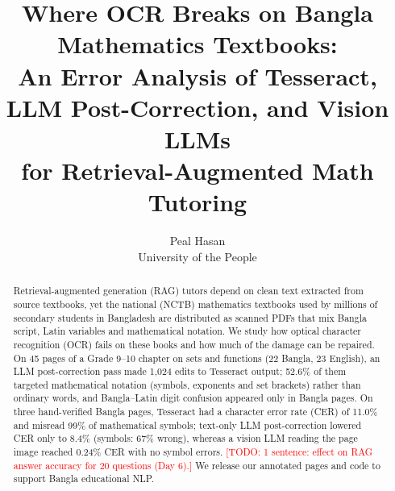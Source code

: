 \documentclass[11pt]{article}
\title{Where OCR Breaks on Bangla Mathematics Textbooks:\\
An Error Analysis of Tesseract, LLM Post-Correction, and Vision LLMs\\
for Retrieval-Augmented Math Tutoring}
\author{Peal Hasan \\ University of the People \\ \todo{email}}
\date{}
\newcommand{\todo}[1]{\textcolor{red}{[TODO: #1]}}
\begin{document}
\maketitle

\begin{abstract}
Retrieval-augmented generation (RAG) tutors depend on clean text extracted
from source textbooks, yet the national (NCTB) mathematics textbooks used by
millions of secondary students in Bangladesh are distributed as scanned PDFs
that mix Bangla script, Latin variables and mathematical notation.
We study how optical character recognition (OCR) fails on these books and how
much of the damage can be repaired.
On 45 pages of a Grade 9--10 chapter on sets and functions (22 Bangla, 23
English), an LLM post-correction pass made 1{,}024 edits to Tesseract output;
52.6\% of them targeted mathematical notation (symbols, exponents and set
brackets) rather than ordinary words, and Bangla--Latin digit confusion
appeared only in Bangla pages.
On three hand-verified Bangla pages, Tesseract had a character error rate
(CER) of 11.0\% and misread 99\% of mathematical symbols; text-only LLM
post-correction lowered CER only to 8.4\% (symbols: 67\% wrong), whereas a
vision LLM reading the page image reached 0.24\% CER with no symbol errors.
\todo{1 sentence: effect on RAG answer accuracy for 20 questions (Day 6).}
We release our annotated pages and code to support Bangla educational NLP.
\end{abstract}

\end{document}
